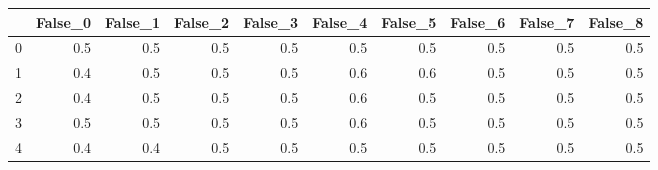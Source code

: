 \begin{tabular}{lrrrrrrrrr}
\toprule
{} &  False\_0 &  False\_1 &  False\_2 &  False\_3 &  False\_4 &  False\_5 &  False\_6 &  False\_7 &  False\_8 \\ \hline
\midrule
0 &      0.5 &      0.5 &      0.5 &      0.5 &      0.5 &      0.5 &      0.5 &      0.5 &      0.5 \\ \hline
1 &      0.4 &      0.5 &      0.5 &      0.5 &      0.6 &      0.6 &      0.5 &      0.5 &      0.5 \\ \hline
2 &      0.4 &      0.5 &      0.5 &      0.5 &      0.6 &      0.5 &      0.5 &      0.5 &      0.5 \\ \hline
3 &      0.5 &      0.5 &      0.5 &      0.5 &      0.6 &      0.5 &      0.5 &      0.5 &      0.5 \\ \hline
4 &      0.4 &      0.4 &      0.5 &      0.5 &      0.5 &      0.5 &      0.5 &      0.5 &      0.5 \\ \hline
\bottomrule
\end{tabular}
